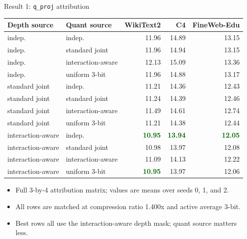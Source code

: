 \documentclass[aspectratio=169]{beamer}
\newcommand{\good}[1]{\textcolor{darkgreen}{\textbf{#1}}}
\begin{document}
\begin{frame}{Result 1: \texttt{q\_proj} attribution}
\scriptsize
\begin{table}
\centering
\setlength{\tabcolsep}{3.5pt}
\begin{tabular}{llrrr}
\toprule
Depth source & Quant source & WikiText2 & C4 & FineWeb-Edu \\
\midrule
indep. & indep. & 11.96 & 14.89 & 13.15 \\
indep. & standard joint & 11.96 & 14.94 & 13.15 \\
indep. & interaction-aware & 12.13 & 15.09 & 13.36 \\
indep. & uniform 3-bit & 11.96 & 14.88 & 13.17 \\
\midrule
standard joint & indep. & 11.21 & 14.36 & 12.43 \\
standard joint & standard joint & 11.24 & 14.39 & 12.46 \\
standard joint & interaction-aware & 11.49 & 14.61 & 12.74 \\
standard joint & uniform 3-bit & 11.21 & 14.38 & 12.44 \\
\midrule
interaction-aware & indep. & \good{10.95} & \good{13.94} & \good{12.05} \\
interaction-aware & standard joint & 10.98 & 13.97 & 12.08 \\
interaction-aware & interaction-aware & 11.09 & 14.13 & 12.22 \\
interaction-aware & uniform 3-bit & \good{10.95} & 13.97 & 12.06 \\
\bottomrule
\end{tabular}
\end{table}

\vspace{-0.05cm}
\begin{itemize}
    \item Full 3-by-4 attribution matrix; values are means over seeds 0, 1, and 2.
    \item All rows are matched at compression ratio 1.400x and active average 3-bit.
    \item Best rows all use the interaction-aware depth mask; quant source matters less.
\end{itemize}
\end{frame}

\end{document}
